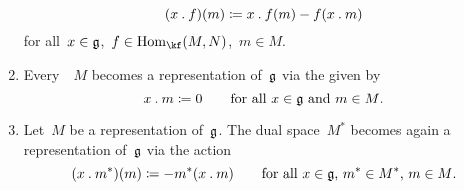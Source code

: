 \begin{proposition}
\begin{enumerate}
			\[
				(x \mathbin{.} f)(m)
				\coloneqq
				x \mathbin{.} f(m) - f(x \mathbin{.} m)
			\]
			for all~$x \in \mathfrak{g}$,~$f \in \Hom_{\kf}(M,N)$,~$m \in M$.
		\item
			Every~{\vectorspace{$\kf$}}~$M$ becomes a representation of~$\mathfrak{g}$ via the  given by
			\[
				x \mathbin{.} m
				\coloneqq
				0
				\qquad
				\text{for all~$x \in \mathfrak{g}$ and~$m \in M$.}
			\]
		\item
			Let~$M$ be a representation of~$\mathfrak{g}$.
			The dual space~$M^*$ becomes again a representation of~$\mathfrak{g}$ via the action
			\[
				(x \mathbin{.} m^*)(m)
				\coloneqq
				- m^*(x \mathbin{.} m)
				\qquad
				\text{for all~$x \in \mathfrak{g}$,~$m^* \in M^*$,~$m \in M$.}
			\]
	\end{enumerate}
\end{proposition}


